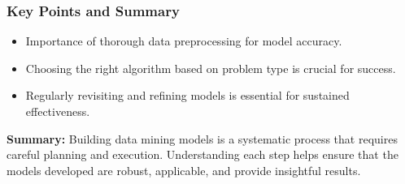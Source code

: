 \documentclass{beamer}
\begin{document}
\begin{frame}
    \frametitle{Key Points and Summary}
    \begin{itemize}
        \item Importance of thorough data preprocessing for model accuracy.
        \item Choosing the right algorithm based on problem type is crucial for success.
        \item Regularly revisiting and refining models is essential for sustained effectiveness.
    \end{itemize}
    
    \textbf{Summary:} Building data mining models is a systematic process that requires careful planning and execution. Understanding each step helps ensure that the models developed are robust, applicable, and provide insightful results.
\end{frame}
\end{document}
